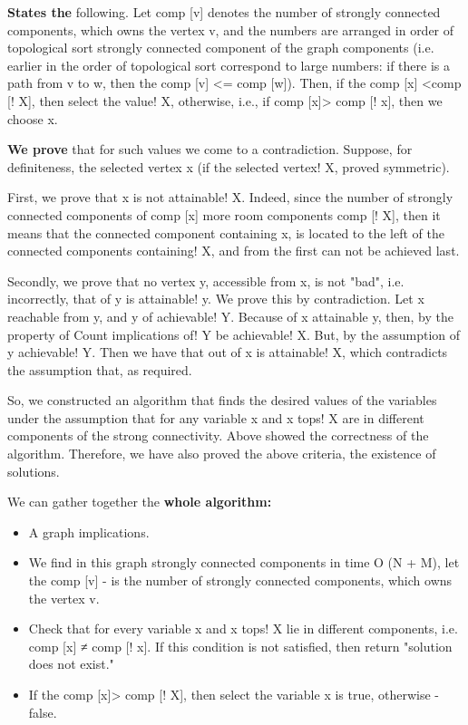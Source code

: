 \textbf{States the} following. Let comp [v] denotes the number of strongly connected components, which owns the vertex v, and the numbers are arranged in order of topological sort strongly connected component of the graph components (i.e. earlier in the order of topological sort correspond to large numbers: if there is a path from v to w, then the comp [v] <= comp [w]). Then, if the comp [x] <comp [! X], then select the value! X, otherwise, i.e., if comp [x]> comp [! x], then we choose x.

\textbf{We prove} that for such values ​​we come to a contradiction. Suppose, for definiteness, the selected vertex x (if the selected vertex! X, proved symmetric).

First, we prove that x is not attainable! X. Indeed, since the number of strongly connected components of comp [x] more room components comp [! X], then it means that the connected component containing x, is located to the left of the connected components containing! X, and from the first can not be achieved last.

Secondly, we prove that no vertex y, accessible from x, is not "bad", i.e. incorrectly, that of y is attainable! y. We prove this by contradiction. Let x reachable from y, and y of achievable! Y. Because of x attainable y, then, by the property of Count implications of! Y be achievable! X. But, by the assumption of y achievable! Y. Then we have that out of x is attainable! X, which contradicts the assumption that, as required.

So, we constructed an algorithm that finds the desired values ​​of the variables under the assumption that for any variable x and x tops! X are in different components of the strong connectivity. Above showed the correctness of the algorithm. Therefore, we have also proved the above criteria, the existence of solutions.

We can gather together the \textbf{whole algorithm:}

\begin{itemize} \item A graph implications. \item We find in this graph strongly connected components in time O (N + M), let the comp [v] - is the number of strongly connected components, which owns the vertex v. \item Check that for every variable x and x tops! X lie in different components, i.e. comp [x] ≠ comp [! x]. If this condition is not satisfied, then return "solution does not exist." \item If the comp [x]> comp [! X], then select the variable x is true, otherwise - false. \end{itemize}

